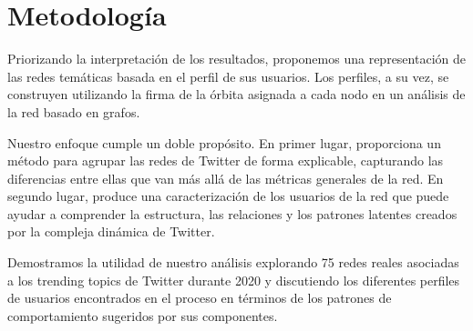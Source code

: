 %


\section{Metodología}
\label{sec:intro:organización}

Priorizando la interpretación de los resultados, proponemos una representación de las redes temáticas basada en el perfil de sus usuarios. Los perfiles, a su vez, se construyen utilizando la firma de la órbita asignada a cada nodo en un análisis de la red basado en grafos. 

Nuestro enfoque cumple un doble propósito. En primer lugar, proporciona un método para agrupar las redes de Twitter de forma explicable, capturando las diferencias entre ellas que van más allá de las métricas generales de la red. En segundo lugar, produce una caracterización de los usuarios de la red que puede ayudar a comprender la estructura, las relaciones y los patrones latentes creados por la compleja dinámica de Twitter. 

Demostramos la utilidad de nuestro análisis explorando 75 redes reales asociadas a los trending topics de Twitter durante 2020 y discutiendo los diferentes perfiles de usuarios encontrados en el proceso en términos de los patrones de comportamiento sugeridos por sus componentes.